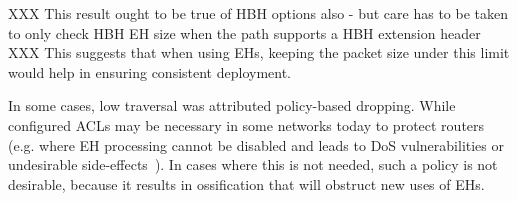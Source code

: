 \documentclass[conference]{IEEEtran}
\begin{document}
XXX This result ought to be true of HBH options also - but care has to be taken to only check HBH EH size when the path supports a HBH extension header XXX
This suggests that when using EHs, keeping the packet size under this limit would help in ensuring consistent deployment.



In some cases, low traversal was attributed policy-based dropping. While configured ACLs may be necessary in some networks today to protect routers (e.g. where EH processing cannot be disabled and leads to DoS vulnerabilities or undesirable side-effects~\cite{passive-threats}). In cases where this is not needed, such a policy is not desirable, because it results in ossification that will obstruct new uses of EHs.







\end{document}
